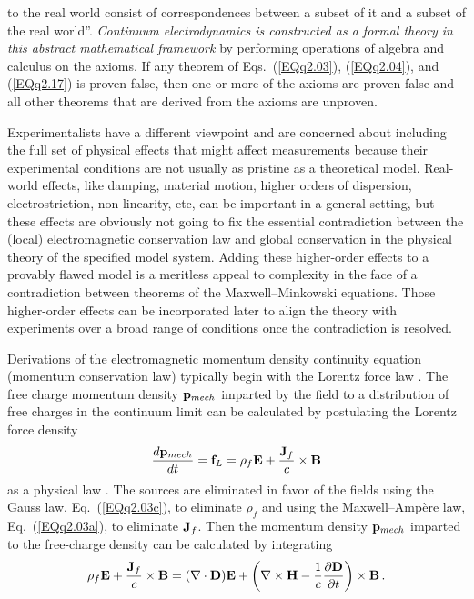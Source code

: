 \documentclass[twocolumn,amssymb,eqsecnum,aps,pra]{revtex4-2}
\begin{document}
to the real world consist of correspondences between a subset of it
and a subset of the real world''.
\textit{Continuum electrodynamics is constructed as a formal theory
in this abstract mathematical framework} by performing operations of
algebra and calculus on the axioms.
If any theorem of Eqs.~(\ref{EQq2.03}), (\ref{EQq2.04}), and 
(\ref{EQq2.17}) is proven false, then one or more of the axioms
are proven false and all other theorems that are derived from the
axioms are unproven.
\par
Experimentalists \cite{BIPfei,BIBrev} have a different viewpoint
and are concerned about including the full set of physical effects
that might affect measurements because their experimental conditions
are not usually as pristine as a theoretical model.
Real-world effects, like damping, material motion, higher orders of
dispersion, electrostriction, non-linearity, etc, can be important
in a general setting, but these effects are obviously not going to
fix the essential contradiction between the (local) electromagnetic 
conservation law and global conservation in the physical theory of
the specified model system.
Adding these higher-order effects to a provably flawed
model is a meritless appeal to complexity in the face of a 
contradiction between theorems of the Maxwell--Minkowski equations.
Those higher-order effects can be incorporated later to align
the theory with experiments over a broad range of conditions once the
contradiction is resolved.
\par
Derivations of the electromagnetic momentum density continuity equation
(momentum conservation law) typically begin with the Lorentz force law
\cite{BIBoydMil,BIJackson,BIGriff,BIZangwill}.
The free charge momentum density ${\bf p}_{mech}$ imparted by the field
to a distribution of free charges in the continuum limit can be
calculated by postulating the Lorentz force density 
\cite{BIBoydMil,BIJackson,BIGriff,BIZangwill}
\begin{equation}
\frac{d{\bf p}_{mech}}{dt}={\bf f}_L=
\rho_f{\bf E}+ \frac{{\bf J}_f}{c}\times{\bf B} 
\label{EQq2.05}
\end{equation}
as a physical law \cite{BIManx,BIMansurx}.
The sources are eliminated in favor of the fields using the Gauss law,
Eq.~(\ref{EQq2.03c}), to eliminate $\rho_f$ and using the
Maxwell--Amp\`ere law, Eq.~(\ref{EQq2.03a}), to eliminate ${\bf J}_f$.
Then the momentum density ${\bf p}_{mech}$ imparted to the
free-charge density can be calculated by
integrating \cite{BIBoydMil,BIJackson,BIGriff,BIZangwill}
\begin{equation}
\rho_f{\bf E}+ \frac{{\bf J}_f}{c}\times{\bf B} =
(\nabla\cdot {\bf D}){\bf E}+ \left (\nabla\times{\bf H}
-\frac{1}{c}\frac{\partial{\bf D}}{\partial t}\right )
\times{\bf B} \, .
\label{EQq2.06}
\end{equation}
\end{document}
